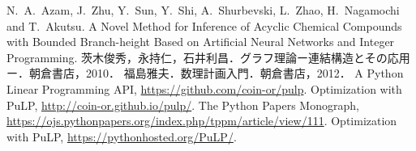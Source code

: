\documentclass[11pt,titlepage,dvipdfmx,twoside]{jarticle}
\begin{document}

% 
% 
% 



\begin{thebibliography}{99}
		N.~A.~Azam, J.~Zhu, Y.~Sun, Y.~Shi, A.~Shurbevski, L.~Zhao, H.~Nagamochi and T.~Akutsu.
		A Novel Method for Inference of Acyclic Chemical Compounds with Bounded Branch-height Based on Artificial Neural Networks and Integer Programming.
   茨木俊秀，永持仁，石井利昌．グラフ理論ー連結構造とその応用ー．朝倉書店，2010． 
   福島雅夫．数理計画入門．朝倉書店，2012． 
   A Python Linear Programming API, \url{https://github.com/coin-or/pulp}.
   Optimization with PuLP, \url{http://coin-or.github.io/pulp/}.
   The Python Papers Monograph, \url{https://ojs.pythonpapers.org/index.php/tppm/article/view/111}.
   Optimization with PuLP, \url{https://pythonhosted.org/PuLP/}.
\end{thebibliography}
\end{document}
